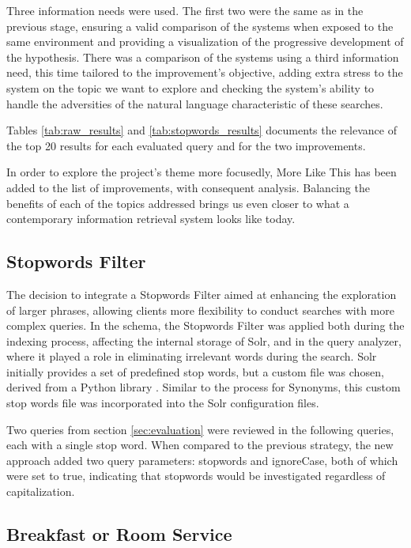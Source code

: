 \documentclass[sigconf]{acmart}
\begin{document}
Three information needs were used. The first two were the same as in the previous stage, ensuring a valid comparison of the systems when exposed to the same environment and providing a visualization of the progressive development of the hypothesis. There was a comparison of the systems using a third information need, this time tailored to the improvement's objective, adding extra stress to the system on the topic we want to explore and checking the system's ability to handle the adversities of the natural language characteristic of these searches.

Tables \ref{tab:raw_results} and \ref{tab:stopwords_results} documents the relevance of the top 20 results for each evaluated query and for the two improvements.

In order to explore the project's theme more focusedly, More Like This \cite{MoreLikeThis} has been added to the list of improvements, with consequent analysis. Balancing the benefits of each of the topics addressed brings us even closer to what a contemporary information retrieval system looks like today.

\subsection{Stopwords Filter}

The decision to integrate a Stopwords Filter aimed at enhancing the exploration of larger phrases, allowing clients more flexibility to conduct searches with more complex queries. In the schema, the Stopwords Filter was applied both during the indexing process, affecting the internal storage of Solr, and in the query analyzer, where it played a role in eliminating irrelevant words during the search.
Solr initially provides a set of predefined stop words, but a custom file was chosen, derived from a Python library \cite{NLTK}. Similar to the process for Synonyms, this custom stop words file was incorporated into the Solr configuration files.

Two queries from section \ref{sec:evaluation} were reviewed in the following queries, each with a single stop word. When compared to the previous strategy, the new approach added two query parameters: stopwords and ignoreCase, both of which were set to true, indicating that stopwords would be investigated regardless of capitalization.

\renewcommand{\thesubsection}{\Alph{subsection}}

\setcounter{subsection}{0}
\subsection{Breakfast or Room Service}
\end{document}
